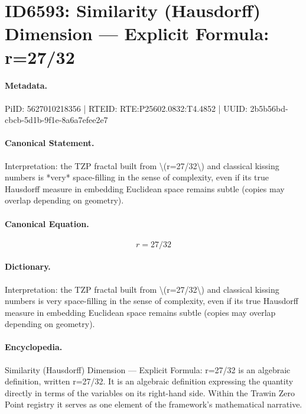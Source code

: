 \section*{ID6593: Similarity (Hausdorff) Dimension — Explicit Formula: r=27/32}
\paragraph{Metadata.}
PiID: 5627010218356 | RTEID: RTE:P25602.0832:T4.4852 | UUID: 2b5b56bd-cbcb-5d1b-9f1e-8a6a7efee2e7

\paragraph{Canonical Statement.}
Interpretation: the TZP fractal built from \textbackslash{}(r=27/32\textbackslash{}) and classical kissing numbers is *very* space-filling in the sense of complexity, even if its true Hausdorff measure in embedding Euclidean space remains subtle (copies may overlap depending on geometry).

\paragraph{Canonical Equation.}
\[
r=27/32
\]

\paragraph{Dictionary.}
Interpretation: the TZP fractal built from \textbackslash{}(r=27/32\textbackslash{}) and classical kissing numbers is very space-filling in the sense of complexity, even if its true Hausdorff measure in embedding Euclidean space remains subtle (copies may overlap depending on geometry).

\paragraph{Encyclopedia.}
Similarity (Hausdorff) Dimension — Explicit Formula: r=27/32 is an algebraic definition, written r=27/32. It is an algebraic definition expressing the quantity directly in terms of the variables on its right-hand side. Within the Trawin Zero Point registry it serves as one element of the framework's mathematical narrative.
